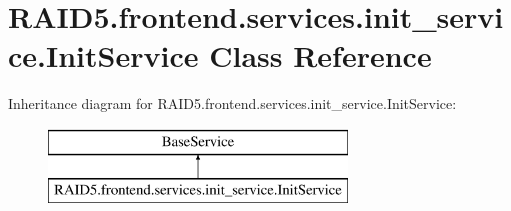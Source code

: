 \hypertarget{class_r_a_i_d5_1_1frontend_1_1services_1_1init__service_1_1_init_service}{}\section{R\+A\+I\+D5.\+frontend.\+services.\+init\+\_\+service.\+Init\+Service Class Reference}
\label{class_r_a_i_d5_1_1frontend_1_1services_1_1init__service_1_1_init_service}
Inheritance diagram for R\+A\+I\+D5.\+frontend.\+services.\+init\+\_\+service.\+Init\+Service\+:\begin{figure}[H]
\begin{center}
\leavevmode
\includegraphics[height=2.000000cm]{class_r_a_i_d5_1_1frontend_1_1services_1_1init__service_1_1_init_service}
\end{center}
\end{figure}
